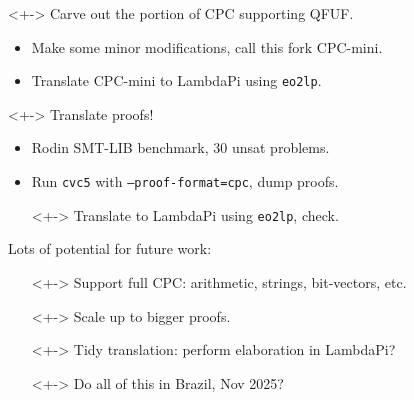 \documentclass[handout, lualatex, compress, 12pt-------------------------------------------------------------------------------------------------------------]{beamer}
\begin{document}
\begin{frame}
	\begin{uncoverenv}<+->
		Carve out the portion of CPC supporting \alert{QFUF}.
		\begin{itemize}
			\item<+-> Make some minor modifications, call this fork \alert{CPC-mini}.
			\item<+-> Translate CPC-mini to LambdaPi using \texttt{eo2lp}.
		\end{itemize}
	\end{uncoverenv}
	\begin{uncoverenv}<+->
		Translate proofs!
		\begin{itemize}
			\item<+-> \alert{Rodin} SMT-LIB benchmark, 30 unsat problems.
			\item<+-> Run \texttt{cvc5} with \texttt{--proof-format=cpc}, dump proofs.
			\item[\emoji{check-mark-button}]<+-> Translate to LambdaPi using \texttt{eo2lp}, check.
		\end{itemize}
	\end{uncoverenv}
\end{frame}

\begin{frame}
	Lots of potential for \alert{future work}:
	\begin{itemize}
		\item[\emoji{globe-showing-europe-africa}]<+-> Support full CPC: arithmetic, strings, bit-vectors, etc.
		\item[\emoji{chart-increasing}]<+-> Scale up to bigger proofs.
		\item[\emoji{broom}]<+-> Tidy translation: perform elaboration in LambdaPi?
		\item[\emoji{flag-brazil}]<+-> Do all of this in Brazil, Nov 2025?
	\end{itemize}
\end{frame}








\end{document}
